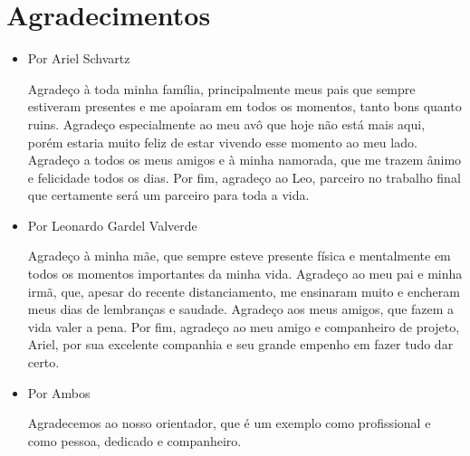 \chapter*{Agradecimentos}

\begin{itemize}
\item Por Ariel Schvartz

Agradeço à toda minha família, principalmente meus pais que sempre estiveram presentes e me apoiaram em todos os momentos, tanto bons quanto ruins. Agradeço especialmente ao meu avô que hoje não está mais aqui, porém estaria muito feliz de estar vivendo esse momento ao meu lado. Agradeço a todos os meus amigos e à minha namorada, que me trazem ânimo e felicidade todos os dias. Por fim, agradeço ao Leo, parceiro no trabalho final que certamente será um parceiro para toda a vida.

\item Por Leonardo Gardel Valverde

Agradeço à minha mãe, que sempre esteve presente física e mentalmente em todos os momentos importantes da minha vida. Agradeço ao meu pai e minha irmã, que, apesar do recente distanciamento, me ensinaram muito e encheram meus dias de lembranças e saudade. Agradeço aos meus amigos, que fazem a vida valer a pena. Por fim, agradeço ao meu amigo e companheiro de projeto, Ariel, por sua excelente companhia e seu grande empenho em fazer tudo dar certo.

\item Por Ambos

Agradecemos ao nosso orientador, que é um exemplo como profissional e como pessoa, dedicado e companheiro.

\end{itemize}
